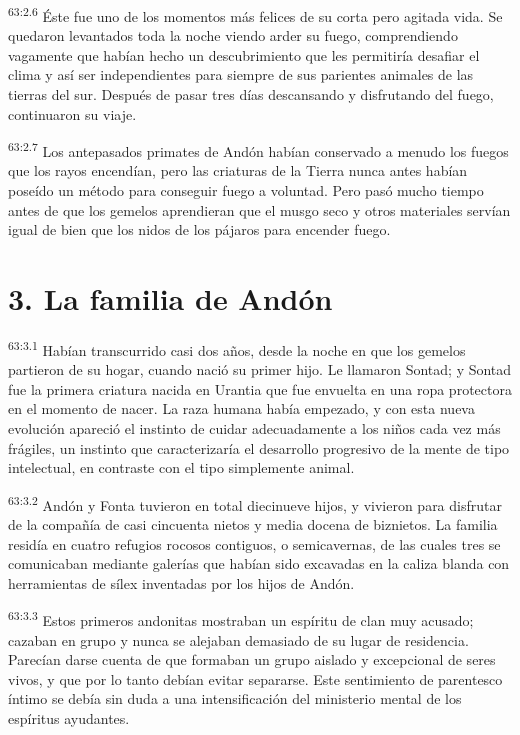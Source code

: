 \par
\textsuperscript{63:2.6} Éste fue uno de los momentos más felices de su corta pero agitada vida. Se quedaron levantados toda la noche viendo arder su fuego, comprendiendo vagamente que habían hecho un descubrimiento que les permitiría desafiar el clima y así ser independientes para siempre de sus parientes animales de las tierras del sur. Después de pasar tres días descansando y disfrutando del fuego, continuaron su viaje.

\par
\textsuperscript{63:2.7} Los antepasados primates de Andón habían conservado a menudo los fuegos que los rayos encendían, pero las criaturas de la Tierra nunca antes habían poseído un método para conseguir fuego a voluntad. Pero pasó mucho tiempo antes de que los gemelos aprendieran que el musgo seco y otros materiales servían igual de bien que los nidos de los pájaros para encender fuego.

\section*{3. La familia de Andón}
\par
\textsuperscript{63:3.1} Habían transcurrido casi dos años, desde la noche en que los gemelos partieron de su hogar, cuando nació su primer hijo. Le llamaron Sontad; y Sontad fue la primera criatura nacida en Urantia que fue envuelta en una ropa protectora en el momento de nacer. La raza humana había empezado, y con esta nueva evolución apareció el instinto de cuidar adecuadamente a los niños cada vez más frágiles, un instinto que caracterizaría el desarrollo progresivo de la mente de tipo intelectual, en contraste con el tipo simplemente animal.

\par
\textsuperscript{63:3.2} Andón y Fonta tuvieron en total diecinueve hijos, y vivieron para disfrutar de la compañía de casi cincuenta nietos y media docena de biznietos. La familia residía en cuatro refugios rocosos contiguos, o semicavernas, de las cuales tres se comunicaban mediante galerías que habían sido excavadas en la caliza blanda con herramientas de sílex inventadas por los hijos de Andón.

\par
\textsuperscript{63:3.3} Estos primeros andonitas mostraban un espíritu de clan muy acusado; cazaban en grupo y nunca se alejaban demasiado de su lugar de residencia. Parecían darse cuenta de que formaban un grupo aislado y excepcional de seres vivos, y que por lo tanto debían evitar separarse. Este sentimiento de parentesco íntimo se debía sin duda a una intensificación del ministerio mental de los espíritus ayudantes.

